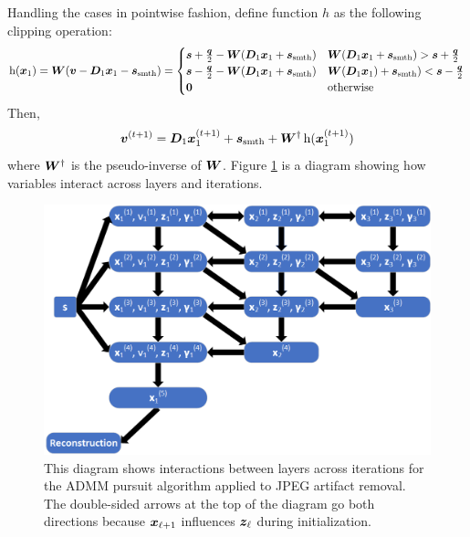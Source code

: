 Handling the cases in pointwise fashion, define function $h$ as the following clipping operation:
%
\begin{equation}
\operatorname{h}(\bm{x}_1) = \bm{W}(\bm{v} - \bm{D}_1\bm{x}_1 - \bm{s}_{\textrm{smth}}) = \begin{cases} \bm{s} + \frac{\bm{q}}{2} - \bm{W}(\bm{D}_1\bm{x}_1 + \bm{s}_{\textrm{smth}}) & \bm{W}(\bm{D}_1\bm{x}_1 + \bm{s}_{\textrm{smth}}) > \bm{s} + \frac{\bm{q}}{2} \\ \bm{s} - \frac{\bm{q}}{2} - \bm{W}(\bm{D}_1\bm{x}_1 + \bm{s}_{\textrm{smth}}) & \bm{W}(\bm{D}_1\bm{x}_1) + \bm{s}_{\textrm{smth}}) < \bm{s} - \frac{\bm{q}}{2} \\ \bm{0} & \text{otherwise}
\end{cases}
\end{equation}
%
Then,
\begin{equation}
\bm{v}^{(t + 1)} = \bm{D}_1\bm{x}_1^{(t + 1)} + \bm{s}_{\text{smth}} + \bm{W}^{\dagger}\operatorname{h}(\bm{x}_1^{(t + 1)})
\end{equation}
where $\bm{W}^{\dagger}$ is the pseudo-inverse of $\bm{W}$. Figure \ref{figure:ADMM Multi-Layer JPEG Diagram} is a diagram showing how variables interact across layers and iterations.
\begin{figure}
	\includegraphics[width=\textwidth]{figures/multi-layer_ADMM-node-dependencies-JPEG.png}
	\caption{This diagram shows interactions between layers across iterations for the ADMM pursuit algorithm applied to JPEG artifact removal. The double-sided arrows at the top of the diagram go both directions because $\bm{x}_{\ell + 1}$ influences $\bm{z}_{\ell}$ during initialization.}
	\label{figure:ADMM Multi-Layer JPEG Diagram}
\end{figure}

